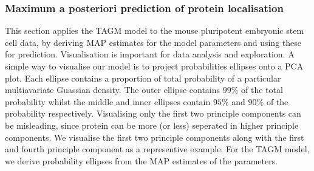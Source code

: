 \documentclass[12pt,english]{article}
\begin{document}
\subsubsection{Maximum a posteriori prediction of protein localisation}
This section applies the TAGM model to the mouse pluripotent embryonic stem cell data,
by deriving MAP estimates for the model parameters and using these for prediction.
Visualisation is important for data analysis and exploration. A simple way to visualise
our model is to project probabilities ellipses onto a PCA plot. Each ellipse
contains a proportion of total probability of a particular multiavariate Guassian density.
The outer ellipse contains $99\%$ of the total probability whilst the middle and inner ellipses contain $95\%$ and $90\%$
of the probability respectively. Visualising only the first two principle components can be misleading, since
protein can be more (or less) seperated in higher principle components.
We visualise the first two principle components along with the first and fourth principle component
as a representive example. For the TAGM model, we derive probability ellipses from the MAP estimates
of the parameters.
\end{document}
